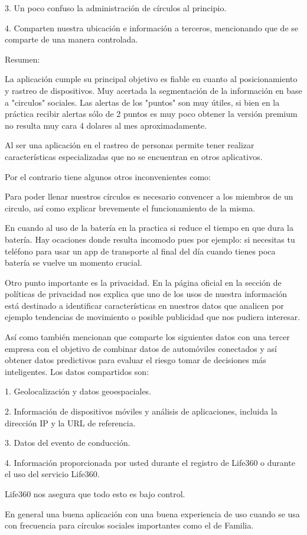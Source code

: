 3. Un poco confuso la administración de círculos al principio.

4. Comparten nuestra ubicación e información a terceros, mencionando que de se comparte de una manera controlada.

Resumen:

La aplicación cumple su principal objetivo es fiable en cuanto al posicionamiento y rastreo de dispositivos. Muy acertada la segmentación de la información en base a "circulos" sociales. Las alertas de los "puntos" son muy útiles, si bien en la práctica recibir alertas sólo de 2 puntos es muy poco obtener la versión premium no resulta muy cara 4 dolares al mes aproximadamente. 

Al ser una aplicación en el rastreo de personas permite tener realizar características especializadas que no se encuentran en otros aplicativos. 

Por el contrario tiene algunos otros inconvenientes como:

Para poder llenar nuestros círculos es necesario convencer a los miembros de un circulo, así como explicar brevemente el funcionamiento de la misma.

En cuando al uso de la batería en la practica si reduce el tiempo en que dura la batería. Hay ocaciones donde resulta incomodo pues por ejemplo: si necesitas tu teléfono para usar un app de transporte al final del día cuando tienes poca batería se vuelve un momento crucial.

Otro punto importante es la privacidad. En la página oficial en la sección de políticas de privacidad\cite{life} nos explica que uno de los usos de nuestra información está destinado a identificar características en nuestros datos que analicen por ejemplo tendencias de movimiento o posible publicidad que nos pudiera interesar.

Así como también mencionan que comparte los siguientes datos con una tercer empresa con el objetivo de combinar datos de automóviles conectados y así obtener datos predictivos para evaluar el riesgo tomar de decisiones más inteligentes. Los datos compartidos son:

1. Geolocalización y datos geoespaciales.

2. Información de dispositivos móviles y análisis de aplicaciones, incluida la dirección IP y la URL de referencia.

3. Datos del evento de conducción.

4. Información proporcionada por usted durante el registro de Life360 o durante el uso del servicio Life360.

Life360 nos asegura que todo esto es bajo control.

En general una buena aplicación con una buena experiencia de uso cuando se usa con frecuencia para círculos sociales importantes como el de Familia.